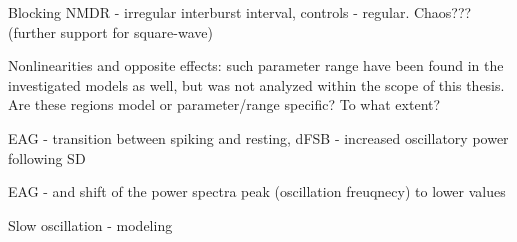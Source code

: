 \documentclass[../main.tex]{subfiles}
\begin{document}
Blocking NMDR - irregular interburst interval, controls - regular.
    Chaos??? (further support for square-wave)
    \parencite{raccugliaNetworkSpecificSynchronizationElectrical2019,izhikevichNEURALEXCITABILITYSPIKING2000}


Nonlinearities and opposite effects: such parameter range have been found in the investigated models as well, but was not analyzed within the scope of this thesis. Are these regions model or parameter/range specific? To what extent?

EAG - transition between spiking and resting, dFSB - increased oscillatory power following SD

EAG - and shift of the power spectra peak (oscillation freuqnecy) to lower values

Slow oscillation - modeling

\color{red}
\end{document}

